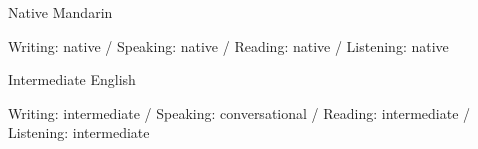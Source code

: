 

\begin{cventries}

    \cventry
        {Native}
        {Mandarin}
        {}
        {}
        {
            \begin{cvitems}
                \item {Writing: native / Speaking: native / Reading: native / Listening: native}
            \end{cvitems}
        }
    \cventry
        {Intermediate} %
        {English} %
        {} %
        {} %
        {
            \begin{cvitems} %
                \item {
                    Writing: intermediate / Speaking: conversational / Reading: intermediate / Listening: intermediate
                }
          \end{cvitems}
        }


        
\end{cventries}
